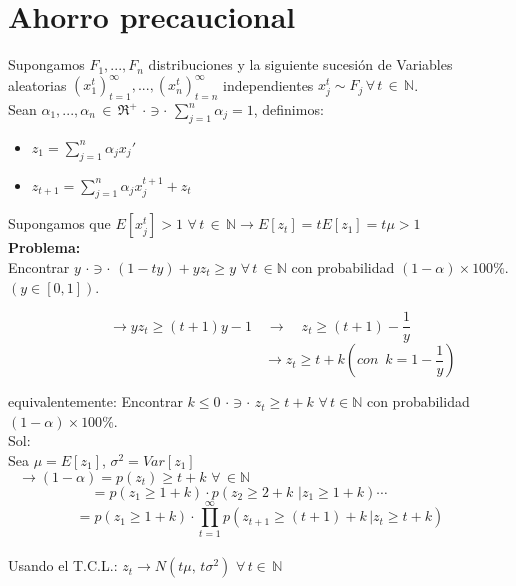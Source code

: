 \section{Ahorro precaucional}

Supongamos $F_1,...,F_n$ distribuciones y la siguiente sucesión de Variables aleatorias $(x_1^t)_{t=1}^{\infty},..., (x_n^t)_{t=n}^{\infty}$ independientes $x_j^{t} \sim F_j \,\forall\, t\, \in\, \mathbb{N}$.\\

Sean $\alpha_1,..., \alpha_n\,\in\,\Re^+\,\, \cdot \ni \cdot \,\,\displaystyle \sum_{j=1}^n\alpha_j=1$, definimos:

\begin{itemize}
 \item $z_1=\displaystyle \sum_{j=1}^n\alpha_jx_j'$ 
 \item $z_{t+1}=\displaystyle \sum_{j=1}^n\alpha_jx_j^{t+1}+z_t$ 
\end{itemize}
Supongamos que $E[x_j^t]>1\,\,\forall\,t \,\in\,\mathbb{N}\rightarrow E[z_t]=tE[z_1]=t\mu>1$\\

{\bf Problema:}\\
Encontrar $y \,\,\cdot \ni\cdot\,\,(1-ty)+yz_t \ge y\,\,\forall\,t\,\in \mathbb{N}$ con probabilidad $(1-\alpha)\times 100\%$. $(y\in[0,1])$.

$$\rightarrow y z_t\ge (t+1)y-1\quad\rightarrow\quad z_t\ge(t+1)-\frac{1}{y}$$
$$\qquad\qquad\qquad\qquad\qquad\qquad\qquad\,\,\rightarrow z_t\ge t+k (con\,\,\,k=1-\frac{1}{y})$$

equivalentemente: Encontrar $k\le 0\,\,\cdot\ni\cdot\,\,z_t\ge t+k\,\,\forall\,t\in\mathbb{N}$ con probabilidad $(1-\alpha)\times 100\%$.\\

Sol: \\
Sea $\mu=E[z_1]$, $\sigma^2=Var[z_1]$\\

\[\rightarrow (1-\alpha)=p(z_t)\ge t+k\,\,\forall\,\in\mathbb{N}\qquad\qquad\qquad\qquad\qquad\qquad\qquad\qquad\quad\quad\]
\[=p(z_1\ge 1+k)\cdot p(z_2\ge 2+k\,\,|z_1\ge 1+k)\cdots\qquad\quad\]
\[=p(z_1\ge 1+k)\cdot\displaystyle\prod_{t=1}^{\infty}p(z_{t+1}\ge (t+1)+k\,|z_t\ge t+k)\]\\

Usando el T.C.L.: $z_t \rightarrow N(t\mu,\,t\sigma^2)\,\,\forall\,t\in\,\mathbb{N}$

